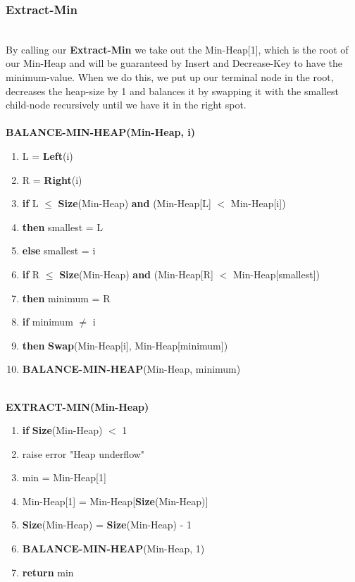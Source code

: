 \documentclass[11pt]{article}
\begin{document}
\subsubsection{Extract-Min}\\
By calling our \textbf{Extract-Min} we take out the Min-Heap[1], which is the root of our Min-Heap and will be guaranteed by Insert and Decrease-Key to have the minimum-value. When we do this, we put up our terminal node in the root, decreases the heap-size by 1 and balances it by swapping it with the smallest child-node recursively until we have it in the right spot.\\\\
\textbf{BALANCE-MIN-HEAP(Min-Heap, i)}
\begin{enumerate}
\setlength\itemsep{0em}
\item L = \textbf{Left}(i)
\item R = \textbf{Right}(i)
\item \textbf{if } L $\leq$ \textbf{Size}(Min-Heap) \textbf{and} (Min-Heap[L] $<$ Min-Heap[i])
\item \tab \textbf{then } smallest = L
\item \tab \textbf{else } smallest = i
\item \textbf{if } R $\leq$ \textbf{Size}(Min-Heap) \textbf{and} (Min-Heap[R] $<$ Min-Heap[smallest])
\item \tab \textbf{then } minimum = R
\item \textbf{if } minimum $\neq$ i
\item \tab \textbf{then } \textbf{Swap}(Min-Heap[i], Min-Heap[minimum])
\item \tab \tab \textbf{BALANCE-MIN-HEAP}(Min-Heap, minimum)
\end{enumerate}
\  \\
\textbf{EXTRACT-MIN(Min-Heap)}
\begin{enumerate}
\setlength\itemsep{0em}
\item \textbf{if } \textbf{Size}(Min-Heap) $<$ 1
\item \tab raise error "Heap underflow"
\item min = Min-Heap[1]
\item Min-Heap[1] = Min-Heap[\textbf{Size}(Min-Heap)]
\item \textbf{Size}(Min-Heap) = \textbf{Size}(Min-Heap) - 1
\item \textbf{BALANCE-MIN-HEAP}(Min-Heap, 1)
\item \textbf{return} min
\end{enumerate}
\  \\
\end{document}
